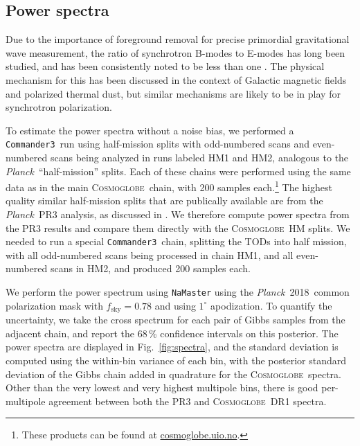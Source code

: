 \documentclass[twocolumn]{../../common/aa}
\def\Planck{\emph{Planck}}
\def\commanderthree{\texttt{Commander3}}
\newcommand{\cosmoglobe}{\textsc{Cosmoglobe}}
\begin{document}
\subsection{Power spectra}


Due to the importance of foreground removal for precise primordial gravitational wave measurement, the ratio of synchrotron B-modes to E-modes has long been studied, and has been consistently noted to be less than one \citep{page2007,planck2014-a12,planck2016-l04}. The physical mechanism for this has been discussed in the context of Galactic magnetic fields and polarized thermal dust, but similar mechanisms are likely to be in play for synchrotron polarization.

To estimate the power spectra without a noise bias, we performed a \commanderthree\ run using half-mission splits with odd-numbered scans and even-numbered scans being analyzed in runs labeled HM1 and HM2, analogous to the \Planck\ ``half-mission'' splits. Each of these chains were performed using the same data as in the main \cosmoglobe\ chain, with 200 samples each.\footnote{These products can be found at \url{cosmoglobe.uio.no}.}
The highest quality similar half-mission splits that are publically available are from the \Planck\ PR3 analysis, as discussed in \citet{planck2016-l04}. We therefore compute power spectra from the PR3 results and compare them directly with the \cosmoglobe\ HM splits.
We needed to run a special \commanderthree\ chain, splitting the TODs into half mission, with all odd-numbered scans being processed in chain HM1, and all even-numbered scans in HM2, and produced 200 samples each. 


We perform the power spectrum using \texttt{NaMaster} \citep{namaster} using the \Planck\ 2018\ common polarization mask with $f_\mathrm{sky}=0.78$ and using $1^\circ$ apodization.
To quantify the uncertainty, we take the cross spectrum for each pair of Gibbs samples from the adjacent chain, and report the 68\,\% confidence intervals on this posterior. The power spectra are displayed in Fig.~\ref{fig:spectra}, and the standard deviation is computed using the within-bin variance of each bin, with the posterior standard deviation of the Gibbs chain added in quadrature for the \cosmoglobe\ spectra.
Other than the very lowest and very highest multipole bins, there is good per-multipole agreement between both the PR3 and \cosmoglobe\ DR1 spectra.
\end{document}
